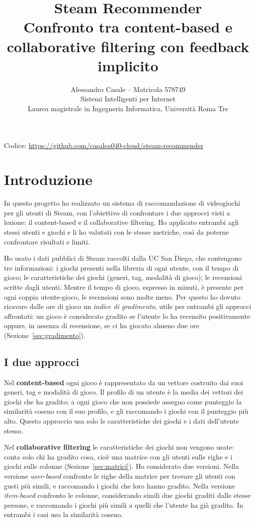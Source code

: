 \documentclass[11pt,a4paper]{article}
\title{Steam Recommender\\[4pt]
\large Confronto tra content-based e collaborative filtering con feedback implicito}
\author{Alessandro Casale -- Matricola 578749\\
Sistemi Intelligenti per Internet\\
Laurea magistrale in Ingegneria Informatica, Università Roma Tre}
\date{}
\begin{document}
\maketitle

\begin{center}
Codice: \url{https://github.com/casalea040-cloud/steam-recommender}
\end{center}

\section{Introduzione}

In questo progetto ho realizzato un sistema di raccomandazione di videogiochi per
gli utenti di Steam, con l'obiettivo di confrontare i due approcci visti a
lezione: il content-based e il collaborative filtering. Ho applicato entrambi
agli stessi utenti e giochi e li ho valutati con le stesse metriche,
così da poterne confrontare risultati e limiti.

Ho usato i dati pubblici di Steam raccolti dalla UC San Diego, che contengono tre
informazioni: i giochi presenti nella libreria di ogni utente, con il tempo di
gioco; le caratteristiche dei giochi (generi, tag, modalità di gioco); le
recensioni scritte dagli utenti. Mentre il tempo di gioco, espresso in minuti, è presente per ogni coppia utente-gioco, le recensioni sono molte meno. Per questo ho dovuto ricavare dalle ore di gioco un \emph{indice di
gradimento}, utile per entrambi gli approcci affrontati: un gioco è considerato gradito se l'utente lo ha recensito
positivamente oppure, in assenza di recensione, se ci ha giocato almeno due ore
(Sezione~\ref{sec:gradimento}). 

\subsection*{I due approcci}

Nel \textbf{content-based} ogni gioco è rappresentato da un vettore costruito dai
suoi generi, tag e modalità di gioco. Il profilo di un utente è la media dei
vettori dei giochi che ha gradito; a ogni gioco che non possiede assegno come
punteggio la similarità coseno con il suo profilo, e gli raccomando i giochi con
il punteggio più alto. Questo approccio usa solo le caratteristiche dei giochi e
i dati dell'utente stesso.

Nel \textbf{collaborative filtering} le caratteristiche dei giochi non vengono
usate: conta solo chi ha gradito cosa, cioè una matrice con gli utenti sulle righe e i
giochi sulle colonne (Sezione~\ref{sec:matrici}). Ho considerato due versioni. Nella versione
\emph{user-based} confronto le righe della matrice per trovare gli utenti con
gusti più simili, e raccomando i giochi che loro hanno gradito. Nella versione
\emph{item-based} confronto le colonne, considerando simili due giochi graditi
dalle stesse persone, e raccomando i giochi più simili a quelli che l'utente ha
già gradito. In entrambi i casi uso la similarità coseno.
\end{document}

